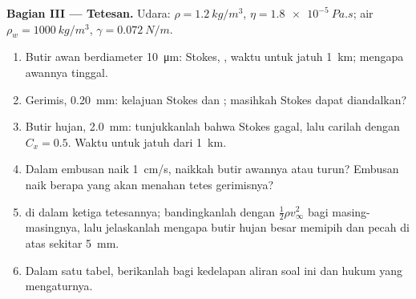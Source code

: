 \begin{problem}
\medskip
\noindent\textbf{Bagian III --- Tetesan.}
Udara: $\rho = \qty{1.2}{kg/m^3}$, $\eta = \qty{1.8e-5}{Pa.s}$; air $\rho_w =
\qty{1000}{kg/m^3}$, $\gamma = \qty{0.072}{N/m}$.
\begin{enumerate}[resume]
  \item Butir awan berdiameter \qty{10}{\micro m}:  Stokes,
        , waktu untuk jatuh \qty{1}{km}; mengapa awannya tinggal.
  \item Gerimis, \qty{0.20}{mm}: kelajuan Stokes dan ;
        masihkah Stokes dapat diandalkan?
  \item Butir hujan, \qty{2.0}{mm}: tunjukkanlah bahwa Stokes gagal, lalu carilah  dengan $C_x = 0.5$. Waktu untuk jatuh dari \qty{1}{km}.
  \item Dalam embusan naik \qty{1}{cm/s}, naikkah butir awannya atau
        turun? Embusan naik berapa yang akan menahan tetes gerimisnya?
  \item {} di dalam ketiga tetesannya; bandingkanlah dengan
         $\tfrac12\rho v_\infty^2$ bagi masing-masingnya, lalu jelaskanlah mengapa
        butir hujan besar memipih dan pecah di atas sekitar \qty{5}{mm}.
  \item Dalam satu tabel, berikanlah bagi kedelapan aliran soal ini
         dan hukum yang mengaturnya.
\end{enumerate}
\end{problem}
